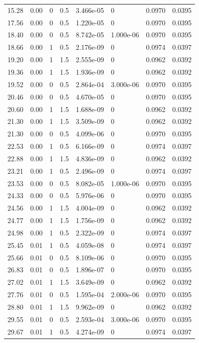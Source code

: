 \documentclass[preview]{standalone}
\begin{document}
{{\begin{tabular}{L{1.2cm}C{1.2cm} C{0.3cm}C{0.5cm} C{1.4cm}C{1.4cm} C{1.4cm}C{1.4cm}}
  15.28  &  0.00  & 0     & 0.5 &  3.466e-05  & 0  & 0.0970 &  0.0395   \\ 
  17.56  &  0.00  & 0     & 0.5 &  1.220e-05  & 0  & 0.0970 &  0.0395   \\ 
  18.40  &  0.00  & 0     & 0.5 &  8.742e-05  & 1.000e-06  & 0.0970 &  0.0395   \\ 
  18.66  &  0.00  & 1     & 0.5 &  2.176e-09  & 0  & 0.0974 &  0.0397   \\ 
  19.20  &  0.00  & 1     & 1.5 &  2.555e-09  & 0  & 0.0962 &  0.0392   \\ 
  19.36  &  0.00  & 1     & 1.5 &  1.936e-09  & 0  & 0.0962 &  0.0392   \\ 
  19.52  &  0.00  & 0     & 0.5 &  2.864e-04  & 3.000e-06  & 0.0970 &  0.0395   \\ 
  20.46  &  0.00  & 0     & 0.5 &  4.670e-05  & 0  & 0.0970 &  0.0395   \\ 
  20.60  &  0.00  & 1     & 1.5 &  1.688e-09  & 0  & 0.0962 &  0.0392   \\ 
  21.30  &  0.00  & 1     & 1.5 &  3.509e-09  & 0  & 0.0962 &  0.0392   \\ 
  21.30  &  0.00  & 0     & 0.5 &  4.099e-06  & 0  & 0.0970 &  0.0395   \\ 
  22.53  &  0.00  & 1     & 0.5 &  6.166e-09  & 0  & 0.0974 &  0.0397   \\ 
  22.88  &  0.00  & 1     & 1.5 &  4.836e-09  & 0  & 0.0962 &  0.0392   \\ 
  23.21  &  0.00  & 1     & 0.5 &  2.496e-09  & 0  & 0.0974 &  0.0397   \\ 
  23.53  &  0.00  & 0     & 0.5 &  8.082e-05  & 1.000e-06  & 0.0970 &  0.0395   \\ 
  24.33  &  0.00  & 0     & 0.5 &  5.976e-06  & 0  & 0.0970 &  0.0395   \\ 
  24.56  &  0.00  & 1     & 1.5 &  4.004e-09  & 0  & 0.0962 &  0.0392   \\ 
  24.77  &  0.00  & 1     & 1.5 &  1.756e-09  & 0  & 0.0962 &  0.0392   \\ 
  24.98  &  0.00  & 1     & 0.5 &  2.322e-09  & 0  & 0.0974 &  0.0397   \\ 
  25.45  &  0.01  & 1     & 0.5 &  4.059e-08  & 0  & 0.0974 &  0.0397   \\ 
  25.66  &  0.01  & 0     & 0.5 &  8.109e-06  & 0  & 0.0970 &  0.0395   \\ 
  26.83  &  0.01  & 0     & 0.5 &  1.896e-07  & 0  & 0.0970 &  0.0395   \\ 
  27.02  &  0.01  & 1     & 1.5 &  3.649e-09  & 0  & 0.0962 &  0.0392   \\ 
  27.76  &  0.01  & 0     & 0.5 &  1.595e-04  & 2.000e-06  & 0.0970 &  0.0395   \\ 
  28.80  &  0.01  & 1     & 1.5 &  9.962e-09  & 0  & 0.0962 &  0.0392   \\ 
  29.55  &  0.01  & 0     & 0.5 &  2.593e-04  & 3.000e-06  & 0.0970 &  0.0395   \\ 
  29.67  &  0.01  & 1     & 0.5 &  4.274e-09  & 0  & 0.0974 &  0.0397   \\ 
\hline 
\end{tabular} 

}}
\end{document}
